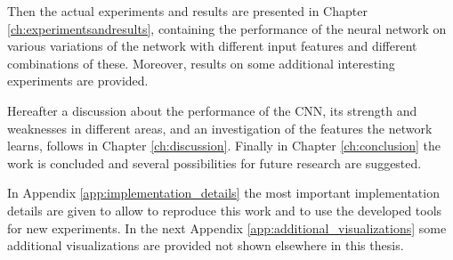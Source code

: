 Then the actual experiments and results are presented in Chapter \ref{ch:experimentsandresults}, containing the performance of the neural network on various variations of the network with different input features and different combinations of these. Moreover, results on some additional interesting experiments are provided.

Hereafter a discussion about the performance of the CNN, its strength and weaknesses in different areas, and an investigation of the features the network learns, follows in Chapter \ref{ch:discussion}. Finally in Chapter \ref{ch:conclusion} the work is concluded and several possibilities for future research are suggested. 

In Appendix \ref{app:implementation_details} the most important implementation details are given to allow to reproduce this work and to use the developed tools for new experiments. In the next Appendix \ref{app:additional_visualizations} some additional visualizations are provided not shown elsewhere in this thesis.

